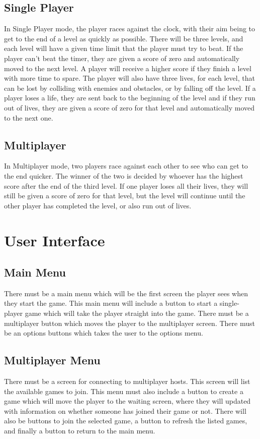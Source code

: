 \documentclass{scrreprt}
\begin{document}
\section{Single Player}
In Single Player mode, the player races against the clock, with their aim being to get to the end of a level as quickly as possible. There will be three levels, and each level will have a given time limit that the player must try to beat. If the player can't beat the timer, they are given a score of zero and automatically moved to the next level. A player will receive a higher score if they finish a level with more time to spare. The player will also have three lives, for each level, that can be lost by colliding with enemies and obstacles, or by falling off the level. If a player loses a life, they are sent back to the beginning of the level and if they run out of lives, they are given a score of zero for that level and automatically moved to the next one.

\section{Multiplayer}
In Multiplayer mode, two players race against each other to see who can get to the end quicker. The winner of the two is decided by whoever has the highest score after the end of the third level. If one player loses all their lives, they will still be given a score of zero for that level, but the level will continue until the other player has completed the level, or also run out of lives.

\chapter{User Interface}
\section{Main Menu}
There must be a main menu which will be the first screen the player sees when they start the game. This main menu will include a button to start a single-player game which will take the player straight into the game. There must be a multiplayer button which moves the player to the multiplayer screen. There must be an options buttons which takes the user to the options menu.

\section{Multiplayer Menu}
There must be a screen for connecting to multiplayer hosts. This screen will list the available games to join. This menu must also include a button to create a game which will move the player to the waiting screen, where they will updated with information on whether someone has joined their game or not. There will also be buttons to join the selected game, a button to refresh the listed games, and finally a button to return to the main menu.
\end{document}
